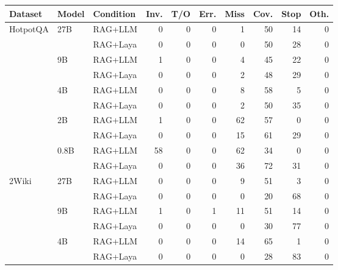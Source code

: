 \begin{tabular}{|l|l|l|r|r|r|r|r|r|r|}
\hline
Dataset & Model & Condition & Inv. & T/O & Err. & Miss & Cov. & Stop & Oth. \\
\hline
HotpotQA & 27B & RAG+LLM & 0 & 0 & 0 & 1 & 50 & 14 & 0 \\ %
\cline{3-10}
 &  & RAG+Laya & 0 & 0 & 0 & 0 & 50 & 28 & 0 \\ %
\cline{2-10}
 & 9B & RAG+LLM & 1 & 0 & 0 & 4 & 45 & 22 & 0 \\ %
\cline{3-10}
 &  & RAG+Laya & 0 & 0 & 0 & 2 & 48 & 29 & 0 \\ %
\cline{2-10}
 & 4B & RAG+LLM & 0 & 0 & 0 & 8 & 58 & 5 & 0 \\ %
\cline{3-10}
 &  & RAG+Laya & 0 & 0 & 0 & 2 & 50 & 35 & 0 \\ %
\cline{2-10}
 & 2B & RAG+LLM & 1 & 0 & 0 & 62 & 57 & 0 & 0 \\ %
\cline{3-10}
 &  & RAG+Laya & 0 & 0 & 0 & 15 & 61 & 29 & 0 \\ %
\cline{2-10}
 & 0.8B & RAG+LLM & 58 & 0 & 0 & 62 & 34 & 0 & 0 \\ %
\cline{3-10}
 &  & RAG+Laya & 0 & 0 & 0 & 36 & 72 & 31 & 0 \\ %
\hline
2Wiki & 27B & RAG+LLM & 0 & 0 & 0 & 9 & 51 & 3 & 0 \\ %
\cline{3-10}
 &  & RAG+Laya & 0 & 0 & 0 & 0 & 20 & 68 & 0 \\ %
\cline{2-10}
 & 9B & RAG+LLM & 1 & 0 & 1 & 11 & 51 & 14 & 0 \\ %
\cline{3-10}
 &  & RAG+Laya & 0 & 0 & 0 & 0 & 30 & 77 & 0 \\ %
\cline{2-10}
 & 4B & RAG+LLM & 0 & 0 & 0 & 14 & 65 & 1 & 0 \\ %
\cline{3-10}
 &  & RAG+Laya & 0 & 0 & 0 & 0 & 28 & 83 & 0 \\ %

\end{tabular}
